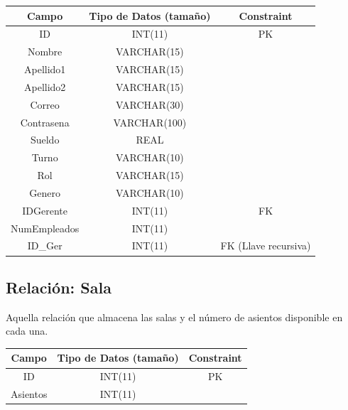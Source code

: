\documentclass[12pt, fleqn]{report}                             %
\begin{document}
            \small{
            \begin{tabular}{| c | c | c |}
                \hline
                \textbf{Campo} & \textbf{Tipo de Datos (tamaño)} & \textbf{Constraint} \\[0.5ex] 
                \hline\hline
                
                ID          & INT(11)       & PK                    \\
                Nombre      & VARCHAR(15)   &                       \\
                Apellido1   & VARCHAR(15)   &                       \\
                Apellido2   & VARCHAR(15)   &                       \\
                Correo      & VARCHAR(30)   &                       \\
                Contrasena  & VARCHAR(100)  &                       \\
                Sueldo      & REAL          &                       \\
                Turno       & VARCHAR(10)   &                       \\
                Rol         & VARCHAR(15)   &                       \\
                Genero      & VARCHAR(10)   &                       \\
                IDGerente   & INT(11)       & FK                    \\
                NumEmpleados& INT(11)       &                       \\
                ID\_Ger     & INT(11)       & FK (Llave recursiva)  \\
                \hline
            \end{tabular}
            }

        \subsection*{Relación: Sala}

            Aquella relación que almacena las salas y el número de asientos disponible
            en cada una.

            \vspace{2em}

            \small{
            \begin{tabular}{| c | c | c |}
                \hline
                \textbf{Campo} & \textbf{Tipo de Datos (tamaño)} & \textbf{Constraint} \\[0.5ex] 
                \hline\hline
                
                ID          & INT(11)       & PK                    \\
                Asientos    & INT(11)       &                       \\
                \hline
            \end{tabular}
            }
\end{document}
